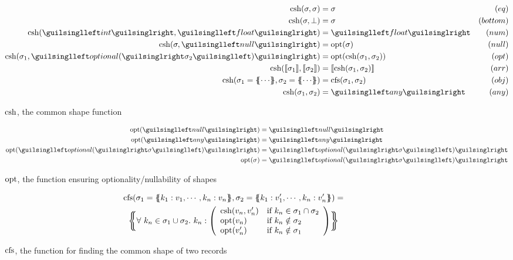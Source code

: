 \begin{figure}[ht!]
\begin{align*}
\csh(\sigma, \sigma)               &=  \sigma               & (eq) \\
\csh(\sigma, \bot)            &=  \sigma               & (bottom) \\
\csh(‹int›, ‹float›)     &= ‹float›          & (num) \\
\csh(\sigma, ‹null›)          &= \opt(\sigma)          & (null) \\
\csh(\sigma_1, ‹optional(›\sigma_2‹)›) &= \opt(\csh(\sigma_1, \sigma_2)) & (opt) \\
\csh(\vect{\sigma_1}, \vect{\sigma_2})           &= \vect{\csh(\sigma_1, \sigma_2)}     & (arr) \\
\csh(\sigma_1 = \recd{ \cdots }, \sigma_2 = \recd{ \cdots }) &= \cfs(\sigma_1, \sigma_2) & (obj) \\
\csh(\sigma_1, \sigma_2)               &= ‹any›            & (any)
\end{align*}
\caption{$\operatorname{csh}$, the common shape function}
\label{fig:csh}
\end{figure}

\begin{figure}[ht!]
\begin{align*}
\opt(‹null›) &= ‹null› \\
\opt(‹any›)  &= ‹any› \\
\opt(‹optional(›\sigma‹)›) &= ‹optional(›\sigma‹)› \\
\opt(\sigma) &= ‹optional(›\sigma‹)›
\end{align*}
\caption{$\operatorname{opt}$, the function ensuring optionality/nullability of shapes}
\label{fig:opt}
\end{figure}

\begin{figure}[ht!]
\begin{gather*}
\cfs(\sigma_1 = \recd{ k_1 : v_1, \cdots, k_n : v_n }, \sigma_2 = \recd{ k_1 : v'_1, \cdots, k_n : v'_n }) = \\
\recd[\bigg]{
\forall\ k_n \in \sigma_1 \cup \sigma_2 .\ k_n : \left( \begin{array}{ll}
  \csh(v_n, v'_n) & \text{if } k_n \in \sigma_1 \cap \sigma_2 \\
  \opt(v_n) & \text{if } k_n \notin \sigma_2 \\
  \opt(v'_n) & \text{if } k_n \notin \sigma_1
\end{array} \right)
}
\end{gather*}
\caption{$\operatorname{cfs}$, the function for finding the common shape of two records}
\label{fig:cfs}
\end{figure}

